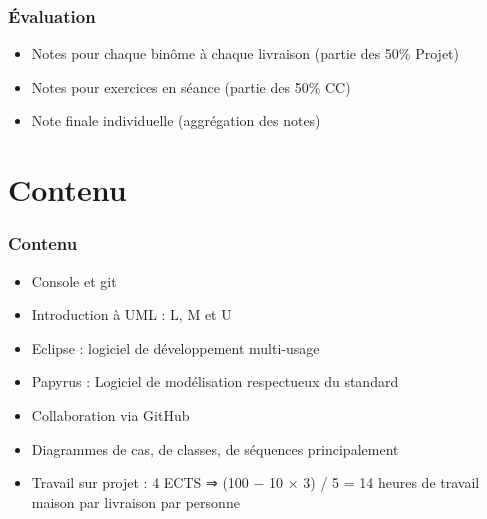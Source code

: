 \documentclass[french]{beamer}
\begin{document}
\begin{frame}
	\frametitle{Évaluation}
	\begin{itemize}
		\item Notes pour chaque binôme à chaque livraison (partie des 50\% Projet)
		\item Notes pour exercices en séance (partie des 50\% CC)
		\item Note finale individuelle (aggrégation des notes)
	\end{itemize}
\end{frame}

\section{Contenu}
\begin{frame}
	\frametitle{Contenu}
	\begin{itemize}
		\item Console et git
		\item Introduction à UML : L, M et U
		\item Eclipse : logiciel de développement multi-usage
		\item Papyrus : Logiciel de modélisation respectueux du standard
		\item Collaboration via GitHub
		\item Diagrammes de cas, de classes, de séquences principalement
		\item Travail sur projet : 4 ECTS ⇒ (100 − 10 × 3) / 5 = 14 heures de travail maison par livraison par personne
	\end{itemize}
\end{frame}
\end{document}
